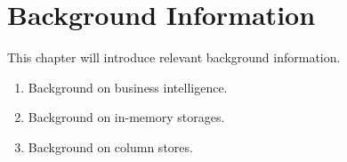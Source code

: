 \chapter{Background Information}
\label{chap:background}
This chapter will introduce relevant background information.
\begin{enumerate}
  \item Background on business intelligence.
  \item Background on in-memory storages.
  \item Background on column stores.
\end{enumerate}
\clearpage




